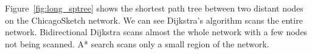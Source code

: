 Figure~\ref{fig:long_sptree} shows the shortest path tree between two distant nodes on the ChicagoSketch network.
We can see Dijkstra's algorithm scans the entire network.
Bidirectional Dijkstra scans almost the whole network with a few nodes not being scanned.
A* search scans only a small region of the network.

